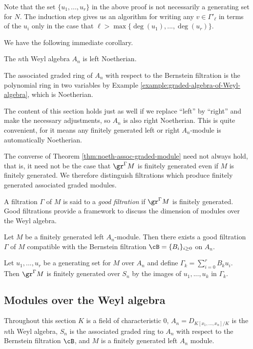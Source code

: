 Note that the set $\{u_1,...,u_r\}$ in the above proof is not necessarily a generating set for $N$. The induction step gives us an algorithm for writing any $v \in \Gamma'_\ell$ in terms of the $u_i$ only in the case that $\ell > \max\{\deg(u_1),...,\deg(u_r)\}$.

We have the following immediate corollary.
\begin{cor}\label{cor:Weyl-algebra-Noetherian}
	The $n$th Weyl algebra $A_n$ is left Noetherian.
\end{cor}
\begin{prf}
	The associated graded ring of $A_n$ with respect to the Bernstein filtration is the polynomial ring in two variables by Example \ref{example:graded-algebra-of-Weyl-algebra}, which is Noetherian.
\end{prf}
The content of this section holds just as well if we replace ``left'' by ``right'' and make the necessary adjustments, so $A_n$ is also right Noetherian. This is quite convenient, for it means any finitely generated left or right $A_n$-module is automatically Noetherian.

The converse of Theorem \ref{thm:noeth-assoc-graded-module} need not always hold, that is, it need not be the case that $\gr^{\Gamma}M$ is finitely generated even if $M$ is finitely generated. We therefore distinguish filtrations which produce finitely generated associated graded modules.
\begin{defn}\label{defn:good-filtration}
	A filtration $\Gamma$ of $M$ is said to a \emph{good filtration} if $\gr^\Gamma M$ is finitely generated. Good filtrations provide a framework to discuss the dimension of modules over the Weyl algebra.
\end{defn}

\begin{prop}\label{prop:good-filtrations-exist}
	Let $M$ be a finitely generated left $A_n$-module. Then there exists a good filtration $\Gamma$ of $M$ compatible with the Bernstein filtration $\cB = \{B_i\}_{i\geq 0}$ on $A_n$.
\end{prop}
\begin{prf}
	Let $u_1,...,u_r$ be a generating set for $M$ over $A_n$ and define $\Gamma_k = \sum_{i=0}^rB_ku_i$. Then $\gr^\Gamma M$ is finitely generated over $S_n$ by the images of $u_1,...,u_k$ in $\Gamma_k$.
\end{prf}

\subsection{Modules over the Weyl algebra}
Throughout this section $K$ is a field of characteristic $0$, $A_n = D_{K[x_1,...,x_n]/K}$ is the $n$th Weyl algebra, $S_n$ is the associated graded ring to $A_n$ with respect to the Bernstein filtration $\cB$, and $M$ is a finitely generated left $A_n$ module.

